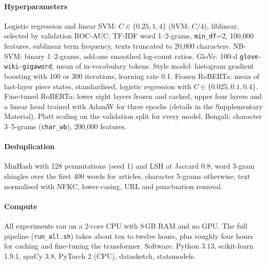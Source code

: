 \paragraph{Hyperparameters}
Logistic regression and linear SVM: $C\in\{0.25,1,4\}$ (SVM: $C/4$), liblinear, selected by validation ROC-AUC; TF-IDF word 1--2-grams, \texttt{min\_df}=2, 100{,}000 features, sublinear term frequency, texts truncated to 20{,}000 characters. NB-SVM: binary 1--2-grams, add-one smoothed log-count ratios. GloVe: 100-d \texttt{glove-wiki-gigaword}, mean of in-vocabulary tokens. Style model: histogram gradient boosting with 100 or 300 iterations, learning rate 0.1. Frozen RoBERTa: mean of last-layer piece states, standardised, logistic regression with $C\in\{0.025,0.1,0.4\}$. Fine-tuned RoBERTa: lower eight layers frozen and cached, upper four layers and a linear head trained with AdamW for three epochs (details in the Supplementary Material). Platt scaling on the validation split for every model. Bengali: character 3--5-grams (\texttt{char\_wb}), 200{,}000 features.
\paragraph{Deduplication}
MinHash with 128 permutations (seed 1) and LSH at Jaccard 0.8; word 3-gram shingles over the first 400 words for articles, character 5-grams otherwise; text normalised with NFKC, lower-casing, URL and punctuation removal.
\paragraph{Compute}
All experiments ran on a 2-core CPU with 8\,GB RAM and no GPU. The full pipeline (\texttt{run\_all.sh}) takes about ten to twelve hours, plus roughly four hours for caching and fine-tuning the transformer. Software: Python 3.13, scikit-learn 1.9.1, spaCy 3.8, PyTorch 2 (CPU), datasketch, statsmodels.

